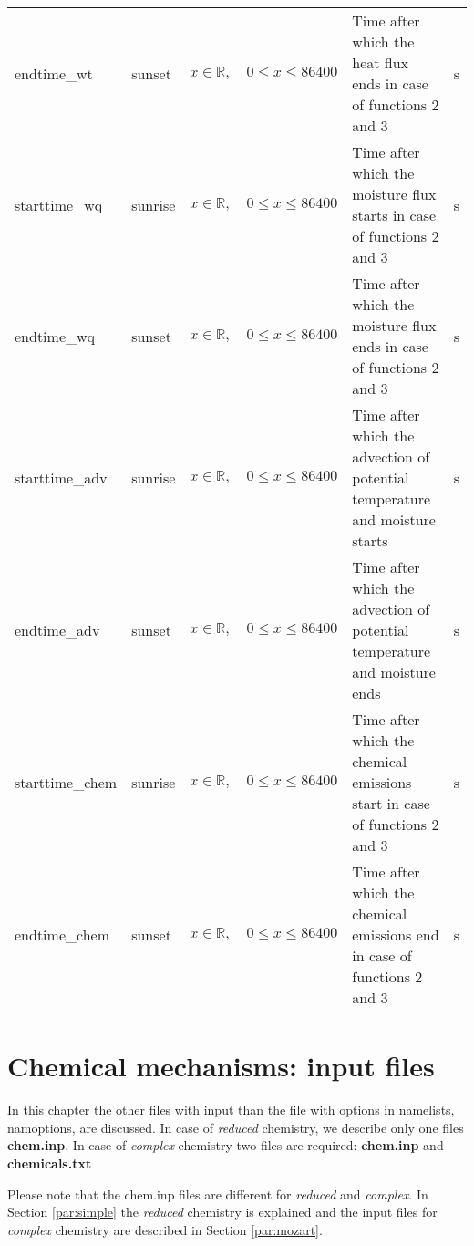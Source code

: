 \documentclass[twoside,11pt,fleqn,a4paper,english,openright]{report}
\begin{document}
\begin{center}
\begin{supertabular}{|l|p{1.6cm}|p{4cm}|p{5cm}|l|}
endtime\_wt		&	sunset	& $x \in \mathbb{R}, \quad 0 \leq x \leq 86400$	& Time after which the heat flux ends in case of functions 2 and 3		&	s\\
starttime\_wq	&	sunrise	& $x \in \mathbb{R}, \quad 0 \leq x \leq 86400$	& Time after which the moisture flux starts in case of functions 2 and 3	&	s\\
endtime\_wq		&	sunset	& $x \in \mathbb{R}, \quad 0 \leq x \leq 86400$	& Time after which the moisture flux ends in case of functions 2 and 3		&	s\\
starttime\_adv	&	sunrise	& $x \in \mathbb{R}, \quad 0 \leq x \leq 86400$	& Time after which the advection of potential temperature and moisture starts	&	s\\
endtime\_adv		&	sunset	& $x \in \mathbb{R}, \quad 0 \leq x \leq 86400$	& Time after which the advection of potential temperature and moisture ends		&	s\\
starttime\_chem	&	sunrise	& $x \in \mathbb{R}, \quad 0 \leq x \leq 86400$	& Time after which the chemical emissions start in case of functions 2 and 3	&	s\\
endtime\_chem		&	sunset	& $x \in \mathbb{R}, \quad 0 \leq x \leq 86400$	& Time after which the chemical emissions end in case of functions 2 and 3		&	s\\
\end{supertabular}
\end{center}


\chapter{Chemical mechanisms: input files}\label{chapter:inputfiles}
In this chapter the other files with input than the file with options in namelists, namoptions, are discussed. 
In case of {\it reduced} chemistry, we describe only one files
{\bf chem.inp}. In case of {\it complex} 
chemistry two files are required:
{\bf chem.inp} and {\bf chemicals.txt}

Please note that the chem.inp files are different for {\it reduced} and
{\it complex}. In Section \ref{par:simple} 
the {\it reduced} chemistry is explained and the input files for {\it complex} chemistry are described in Section \ref{par:mozart}.
\end{document}
